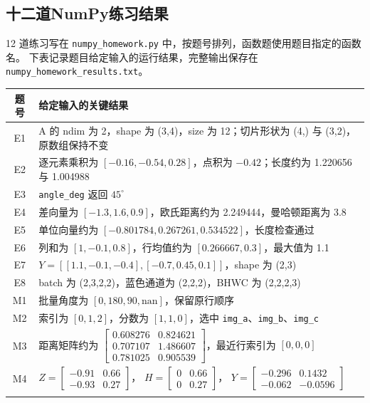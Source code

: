 \documentclass[a4paper,12pt]{article}
\newcommand{\file}[1]{\nolinkurl{#1}}
\begin{document}
\subsection{十二道NumPy练习结果}
12 道练习写在 \file{numpy_homework.py} 中，按题号排列，函数题使用题目指定的函数名。
下表记录题目给定输入的运行结果，完整输出保存在\file{numpy_homework_results.txt}。

\noindent\begin{tabularx}{\textwidth}{@{}c>{\raggedright\arraybackslash}X@{}}
\toprule
\textbf{题号} & \textbf{给定输入的关键结果} \\
\midrule
E1 & A 的 ndim 为 2，shape 为 (3,4)，size 为 12；切片形状为 (4,) 与 (3,2)，原数组保持不变 \\
E2 & 逐元素乘积为 $[-0.16,-0.54,0.28]$，点积为 $-0.42$；长度约为 1.220656 与 1.004988 \\
E3 & \file{angle_deg} 返回 $45^{\circ}$ \\
E4 & 差向量为 $[-1.3,1.6,0.9]$，欧氏距离约为 2.249444，曼哈顿距离为 3.8 \\
E5 & 单位向量约为 $[-0.801784,0.267261,0.534522]$，长度检查通过 \\
E6 & 列和为 $[1,-0.1,0.8]$，行均值约为 $[0.266667,0.3]$，最大值为 1.1 \\
E7 & $Y=[[1.1,-0.1,-0.4],[-0.7,0.45,0.1]]$，shape 为 (2,3) \\
E8 & batch 为 (2,3,2,2)，蓝色通道为 (2,2,2)，BHWC 为 (2,2,2,3) \\
M1 & 批量角度为 $[0,180,90,\mathrm{nan}]$，保留原行顺序 \\
M2 & 索引为 $[0,1,2]$，分数为 $[1,1,0]$，选中 \file{img_a}、\file{img_b}、\file{img_c} \\
M3 & 距离矩阵约为 $\begin{bmatrix}0.608276&0.824621\\0.707107&1.486607\\0.781025&0.905539\end{bmatrix}$，最近行索引为 $[0,0,0]$ \\
\addlinespace[0.4em]
M4 & $Z=\begin{bmatrix}-0.91&0.66\\-0.93&0.27\end{bmatrix}$，
      $H=\begin{bmatrix}0&0.66\\0&0.27\end{bmatrix}$，
      $Y=\begin{bmatrix}-0.296&0.1432\\-0.062&-0.0596\end{bmatrix}$ \\
\addlinespace[0.4em]
\bottomrule
\end{tabularx}
\end{document}

